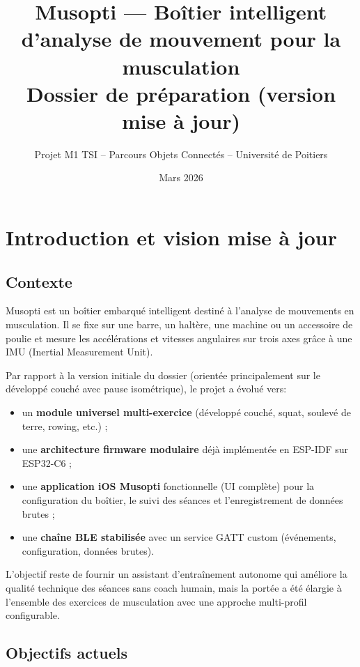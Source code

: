 \documentclass[a4paper,11pt]{article}
\title{Musopti --- Boîtier intelligent d'analyse de mouvement pour la musculation\\[0.25em]
{\large Dossier de préparation (version mise à jour)}}
\author{Projet M1 TSI -- Parcours Objets Connectés -- Université de Poitiers}
\date{Mars 2026}
\begin{document}
\maketitle

\tableofcontents
\newpage

\section{Introduction et vision mise à jour}

\subsection{Contexte}

Musopti est un boîtier embarqué intelligent destiné à l'analyse de mouvements en musculation. Il se fixe sur une barre, un haltère, une machine ou un accessoire de poulie et mesure les accélérations et vitesses angulaires sur trois axes grâce à une IMU (Inertial Measurement Unit).

Par rapport à la version initiale du dossier (orientée principalement sur le développé couché avec pause isométrique), le projet a évolué vers:
\begin{itemize}
  \item un \textbf{module universel multi-exercice} (développé couché, squat, soulevé de terre, rowing, etc.) ;
  \item une \textbf{architecture firmware modulaire} déjà implémentée en ESP-IDF sur ESP32-C6 ;
  \item une \textbf{application iOS Musopti} fonctionnelle (UI complète) pour la configuration du boîtier, le suivi des séances et l'enregistrement de données brutes ;
  \item une \textbf{chaîne BLE stabilisée} avec un service GATT custom (événements, configuration, données brutes).
\end{itemize}

L'objectif reste de fournir un assistant d'entraînement autonome qui améliore la qualité technique des séances sans coach humain, mais la portée a été élargie à l'ensemble des exercices de musculation avec une approche multi-profil configurable.

\subsection{Objectifs actuels}
\end{document}
